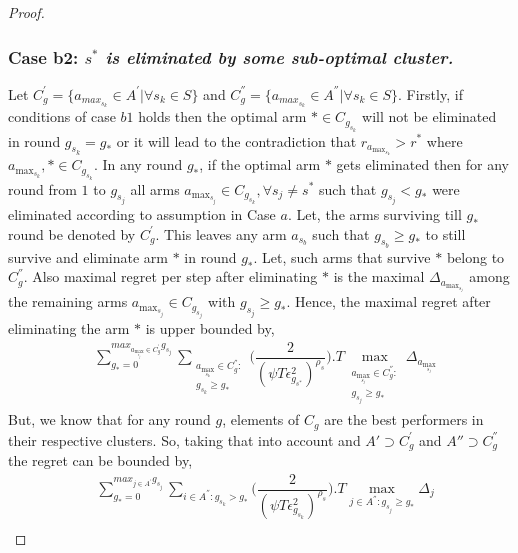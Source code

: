 \begin{proof}
\subsubsection*{Case b2: \textit{$s^{*}$ is eliminated by some sub-optimal cluster.} } 
	
	Let $C_{g}^{'}=\lbrace a_{max_{s_{k}}}\in A^{'}|\forall s_{k}\in S \rbrace$ and $C_{g}^{''}=\lbrace a_{max_{s_{k}}}\in A^{''}|\forall s_{k}\in S \rbrace$. Firstly, if conditions of case $b1$ holds then the optimal arm ${*}\in C_{g_{s_{k}}}$ will not be eliminated in round $g_{s_{k}}=g_{*}$ or it will lead to the contradiction that $r_{a_{\max_{s_{k}}}}>r^{*}$ where $a_{\max_{s_{k}}},{*}\in C_{g_{s_{k}}}$. In any round $g_{*}$, if the optimal arm ${*}$ gets eliminated then for any round from $1$ to $g_{s_{j}}$ all arms $a_{\max_{s_{j}}}\in C_{g_{s_{k}}},\forall s_{j}\neq s^{*}$ such that $g_{s_{j}}< g_{*}$ were eliminated according to assumption in Case $a$. Let, the arms surviving till $g_{*}$ round be denoted by $C_{g}^{'}$. This leaves any arm $a_{s_{b}}$ such that $g_{s_{b}}\geq g_{*}$ to still survive and eliminate arm ${*}$ in round $g_{*}$. Let, such arms that survive ${*}$ belong to $C_{g}^{''}$. Also maximal regret per step after eliminating ${*}$ is the maximal $\Delta_{a_{\max_{s_{j}}}}$ among the remaining arms ${a_{\max_{s_{j}}}}\in C_{g_{s_{j}}}$ with $g_{s_{j}}\geq g_{*}$. Hence, the maximal regret after eliminating the arm ${*}$ is upper bounded by, 
 \begin{align*}
 &\sum_{g_{*}=0}^{max_{a_{\max_{s_{j}}}\in C_{g}^{'}}g_{s_{j}}}\sum_{\substack{a_{\max_{s_{k}}}\in C_{g}^{''}: \\ g_{s_{k}} \geq g_{*}}}\bigg(\dfrac{2}{(\psi T\epsilon_{g_{s^{*}}}^{2})^{\rho_{s}}} \bigg).T\max_{\substack{a_{\max_{s_{j}}}\in C_{g}^{''}: \\ g_{s_{j}}\geq g_{*}}}{\Delta}_{a_{\max_{s_{j}}}}
 \end{align*}
But, we know that for any round $g$, elements of $C_{g}$ are the best performers in their respective clusters. So, taking that into account and $A'\supset C_{g}^{'}$ and $A''\supset C_{g}^{''}$ the regret can be bounded by,
\begin{align*}
 & \sum_{g_{*}=0}^{max_{j\in A^{'}}g_{s_{j}}}\sum_{i\in A^{''}:g_{s_{k}}>g_{*}}\bigg(\dfrac{2}{(\psi T\epsilon_{g_{s_{k}}}^{2})^{\rho_{s}}} \bigg).T\max_{j\in A^{''}:g_{s_{j}}\geq g_{*}}{\Delta}_{j}\\

\end{align*}
\end{proof}
